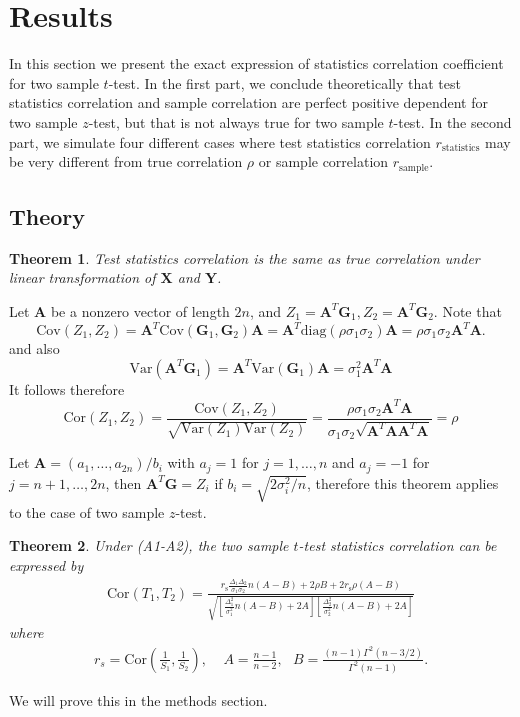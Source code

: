 \documentclass[12pt, a4paper]{article}
\newtheorem{theorem}{Theorem}       %
\begin{document}
	
	
	\section{Results}
	
	In this section we present the exact expression of statistics correlation coefficient for two
	sample $t$-test. In the first part, we conclude theoretically that test statistics correlation and
	sample correlation are perfect positive dependent for two sample $z$-test, but that is not always
	true for two sample $t$-test. In the second part, we simulate four different cases where test
	statistics correlation $r_{\text{statistics}}$ may be very different from true correlation $\rho$ or
	sample correlation $r_{\text{sample}}$. 
	\subsection{Theory}
	\begin{theorem} 
		Test statistics correlation is the same as true correlation under linear transformation of $\bm X$
		and $\bm Y$.
	\end{theorem}
	Let $\bm A$ be a nonzero vector of length $2n$, and $Z_1 =\bm A^T\bm G_1, Z_2 = \bm A^T\bm G_2$. 
	Note that \[
	\text{Cov}(Z_1, Z_2) = \bm A^T\text{Cov}(\bm G_1, \bm G_2)\bm A = \bm
	A^T\text{diag}(\rho\sigma_1\sigma_2)\bm A =\rho\sigma_1\sigma_2\bm A^T\bm A.\]
	and also
	\[\text{Var}(\bm A^T\bm G_1) = \bm A^T\text{Var}(\bm G_1)\bm A = \sigma_1^2\bm A^T\bm A\]
	It follows therefore 
	\[\text{Cor}(Z_1, Z_2) = \frac{\text{Cov}(Z_1, Z_2) }{\sqrt{\text{Var}(Z_1)\text{Var}(Z_2)}} =
	\frac{\rho\sigma_1\sigma_2\bm A^T\bm A}{\sigma_1\sigma_2 \sqrt{\bm A^T\bm A\bm A^T\bm A}}=\rho\]
	
	Let $\bm A = (a_1, \ldots, a_{2n}) /b_i$ with $a_j = 1$ for $j = 1, \ldots, n$ and $a_j = -1$ for $j
	=n+1, \ldots, 2n$, then $\bm A^T \bm G = Z_i$ if $b_i = \sqrt{2\sigma_i^2 /n}$, therefore this
	theorem applies to the case of two sample $z$-test.
	
	\begin{theorem}\label{theoremTstat} 
		Under (A1-A2),  the two sample $t$-test statistics correlation can be expressed by 
		\begin{align}\label{tTestCorrelation}
			\text{Cor}(T_1, T_2)  = \frac{r_{\text{s}}\frac{\Delta_1\Delta_2}{\sigma_1\sigma_2}n(A-B) + 2\rho B
				+ 2r_{\text{s}}\rho(A-B)}{\sqrt{\left[ \frac{\Delta_1^2}{\sigma_1^2}n(A-B) + 2
					A\right]\left[\frac{\Delta_2^2}{\sigma_2^2}n(A-B) + 2 A\right]}}
		\end{align} where 
		\begin{align}\label{invScor}
			r_s = \text{Cor}(\frac{1}{S_1}, \frac{1}{S_2}), ~~~~~A = \frac{n-1}{n-2}, ~~~B =
			\frac{(n-1)\Gamma^2(n-3/2)}{\Gamma^2(n-1)}.
		\end{align}
	\end{theorem}
	We will prove this in the methods section.
	
\end{document}
